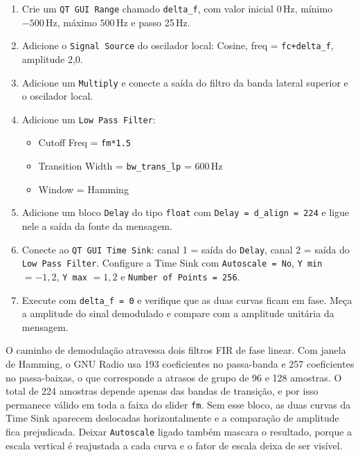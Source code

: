 \documentclass[11pt,a4paper]{article}
\begin{document}
\begin{instrucao}
\begin{enumerate}[label=\arabic*.]
  \item Crie um \texttt{QT GUI Range} chamado \texttt{delta\_f}, com valor
    inicial 0\,Hz, mínimo $-500$\,Hz, máximo $500$\,Hz e passo 25\,Hz.
  \item Adicione o \texttt{Signal Source} do oscilador local: Cosine,
    freq = \texttt{fc+delta\_f}, amplitude 2,0.
  \item Adicione um \texttt{Multiply} e conecte a saída do filtro da banda
    lateral superior e o oscilador local.
  \item Adicione um \texttt{Low Pass Filter}:
    \begin{itemize}
      \item Cutoff Freq = \texttt{fm*1.5}
      \item Transition Width = \texttt{bw\_trans\_lp} = 600\,Hz
      \item Window = Hamming
    \end{itemize}
  \item Adicione um bloco \texttt{Delay} do tipo \texttt{float} com
    \texttt{Delay = d\_align = 224} e ligue nele a saída da fonte da mensagem.
  \item Conecte ao \texttt{QT GUI Time Sink}: canal 1 = saída do \texttt{Delay},
    canal 2 = saída do \texttt{Low Pass Filter}. Configure a Time Sink com
    \texttt{Autoscale = No}, \texttt{Y min} $=-1{,}2$, \texttt{Y max} $=1{,}2$ e
    \texttt{Number of Points = 256}.
  \item Execute com \texttt{delta\_f = 0} e verifique que as duas curvas ficam
    em fase. Meça a amplitude do sinal demodulado e compare com a amplitude
    unitária da mensagem.
\end{enumerate}
\end{instrucao}

\begin{atencao}
O caminho de demodulação atravessa dois filtros FIR de fase linear. Com
janela de Hamming, o GNU Radio usa 193 coeficientes no passa-banda e 257
coeficientes no passa-baixas, o que corresponde a atrasos de grupo de 96 e 128
amostras. O total de 224 amostras depende apenas das bandas de transição, e
por isso permanece válido em toda a faixa do slider \texttt{fm}. Sem esse
bloco, as duas curvas da Time Sink aparecem deslocadas horizontalmente e a
comparação de amplitude fica prejudicada. Deixar \texttt{Autoscale} ligado
também mascara o resultado, porque a escala vertical é reajustada a cada
curva e o fator de escala deixa de ser visível.
\end{atencao}
\end{document}
